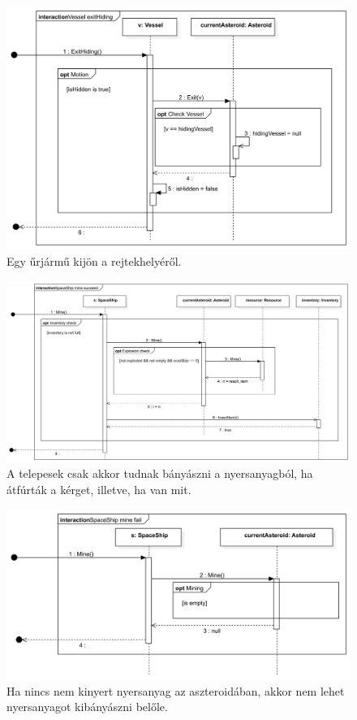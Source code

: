 \begin{figure}[H] 
\centering 
\includegraphics[width=1\textwidth]{docs/3_Project/svg/Design Model!Vessel Actions!Vessel exitHiding!Vessel exitHiding_14.png} 
\caption{Egy űrjármű kijön a rejtekhelyéről.} 
\end{figure} 

\begin{figure}[H] 
\centering 
\includegraphics[width=1\textwidth]{docs/3_Project/svg/Design Model!Vessel Actions!SpaceShip mine succeed!SpaceShip mine succeed_15.png} 
\caption{A telepesek csak akkor tudnak bányászni a nyersanyagból, ha átfúrták a kérget, illetve, ha van mit.} 
\end{figure} 

\begin{figure}[H] 
\centering 
\includegraphics[width=1\textwidth]{docs/3_Project/svg/Design Model!Vessel Actions!SpaceShip mine fail!SpaceShip mine fail_16.png} 
\caption{Ha nincs nem kinyert nyersanyag az aszteroidában, akkor nem lehet nyersanyagot kibányászni belőle.} 
\end{figure} 

